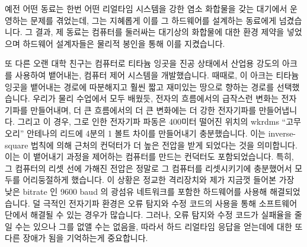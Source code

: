 예전 어떤 동료는 한번 어떤 리얼타임 시스템을 강한 염소 화합물을 갖는 대기에서
운영하는 문제를 겪었는데, 그는 지혜롭게 이를 그 하드웨어를 설계하는 동료에게
넘겼습니다.
그 결과, 제 동료는 컴퓨터를 둘러싸는 대기상의 화합물에 대한 환경 제약을
넣었으며 하드웨어 설계자들은 물리적 봉인을 통해 이를 지켰습니다.

또 다른 오랜 대학 친구는 컴퓨터로 티타늄 잉곳을 진공 상태에서 산업용 강도의
아크를 사용하여 뱉어내는, 컴퓨터 제어 시스템을 개발했습니다.
때때로, 이 아크는 티타늄 잉곳을 뱉어내는 경로에 따분해지고 훨씬 짧고 재미있는
땅으로 향하는 경로를 선택했습니다.
우리가 물리 수업에서 모두 배웠듯, 전자의 흐름에서의 급작스런 변화는 전자기파를
만들어내며, 더 큰 흐름에서의 더 큰 변화에는 더 강한 전자기파를 만들어냅니다.
그리고 이 경우, 그로 인한 전자기파 파동은 400미터 떨어진 위치의 wkrdms ``고무
오리'' 안테나의 리드에 4분의 1 볼트 차이를 만들어내기 충분했습니다.
이는 inverse-square 법칙에 의해 근처의 컨덕터가 더 높은 전압을 받게 되었다는
것을 의미합니다.
이는 이 뱉어내기 과정을 제어하는 컴퓨터를 만드는 컨덕터도 포함되었습니다.
특히, 그 컴퓨터의 리셋 선에 가해진 전압은 정말로 그 컴퓨터를 리셋시키기에
충분했어서 모두를 어리둥절하게 했습니다.
이 상황은 정교한 격리장치와 제가 지금껏 들어본 가장 낮은 bitrate 인 9600 baud
의 광섬유 네트워크를 포함한 하드웨어를 사용해 해결되었습니다.
덜 극적인 전자기파 환경은 오류 탐지와 수정 코드의 사용을 통해 소프트웨어 단에서
해결될 수 있는 경우가 많습니다.
그러나, 오류 탐지와 수정 코드가 실패율을 줄일 수는 있으나 그를 없앨 수는
없음을, 따라서 하드 리얼타임 응답을 얻는데에 대한 또다른 장애가 됨을 기억하는게
중요합니다.

